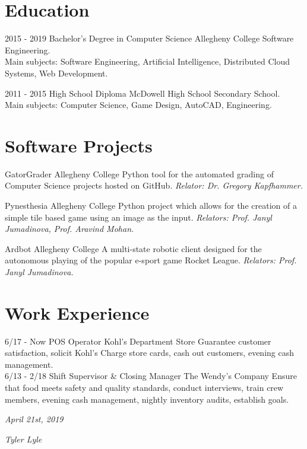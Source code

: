 \documentclass[]{friggeri-cv}
\begin{document}
\section{Education}
\begin{entrylist}
	\entry
	{2015 - 2019}
	{Bachelor's Degree in Computer Science}
	{Allegheny College}
	{Software Engineering.\\
		Main subjects: Software Engineering, Artificial Intelligence, Distributed Cloud Systems, Web Development.\\
	}
	
	\entry
	{2011 - 2015}
	{High School Diploma}
	{McDowell High School}
	{Secondary School.\\
		Main subjects: Computer Science, Game Design, AutoCAD, Engineering.\\}
\end{entrylist}

\section{Software Projects}
\begin{entrylist}
	\entry
	{}
	{GatorGrader}
	{Allegheny College}
	{Python tool for the automated grading of Computer Science projects hosted on GitHub. \emph{Relator: Dr. Gregory Kapfhammer.}\\}
	
	\entry
	{}
	{Pynesthesia}
	{Allegheny College}
	{Python project which allows for the creation of a simple tile based game using an image as the input. \emph{Relators: Prof. Janyl Jumadinova, Prof. Aravind Mohan.}\\}
	
	\entry
	{}
	{Ardbot}
	{Allegheny College}
	{A multi-state robotic client designed for the autonomous playing of the popular e-sport game Rocket League. \emph{Relators: Prof. Janyl Jumadinova.}\\}
	
\end{entrylist}

\section{Work Experience}
\begin{entrylist}
  \entry
    {6/17 - Now}
    {POS Operator}
    {Kohl's Department Store}
    {Guarantee customer satisfaction, solicit Kohl's Charge store cards, cash out customers, evening cash management.\\}
  \entry
    {6/13 - 2/18}
    {Shift Supervisor \& Closing Manager}
    {The Wendy's Company}
    {Ensure that food meets safety and quality standards, conduct interviews, train crew members, evening cash management, nightly inventory audits, establish goals.\\}
\end{entrylist}

\begin{flushleft}
\emph{April 21st, 2019}
\end{flushleft}
\begin{flushright}
\emph{Tyler Lyle}
\end{flushright}
\end{document}
